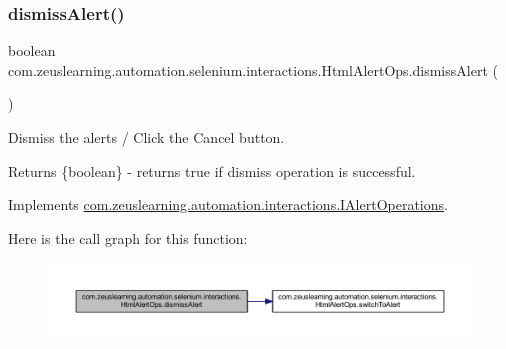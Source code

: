 \subsubsection{\texorpdfstring{dismiss\+Alert()}{dismissAlert()}}
{\footnotesize\ttfamily boolean com.\+zeuslearning.\+automation.\+selenium.\+interactions.\+Html\+Alert\+Ops.\+dismiss\+Alert (\begin{DoxyParamCaption}{ }\end{DoxyParamCaption})\hspace{0.3cm}{\ttfamily [inline]}}

Dismiss the alerts / Click the {\ttfamily Cancel} button.

\begin{DoxyReturn}{Returns}
\{boolean\} -\/ returns {\ttfamily true} if dismiss operation is successful. 
\end{DoxyReturn}


Implements \hyperlink{interfacecom_1_1zeuslearning_1_1automation_1_1interactions_1_1IAlertOperations_a0c8a54b5a80611b77880dd4cc999e88d}{com.\+zeuslearning.\+automation.\+interactions.\+I\+Alert\+Operations}.

Here is the call graph for this function\+:\nopagebreak
\begin{figure}[H]
\begin{center}
\leavevmode
\includegraphics[width=350pt]{d9/d71/classcom_1_1zeuslearning_1_1automation_1_1selenium_1_1interactions_1_1HtmlAlertOps_aac58187434100d2fe2091f388f082c22_cgraph}
\end{center}
\end{figure}
\hypertarget{classcom_1_1zeuslearning_1_1automation_1_1selenium_1_1interactions_1_1HtmlAlertOps_a7d65f164e9145ca8035e196c7dd7da87}{}\label{classcom_1_1zeuslearning_1_1automation_1_1selenium_1_1interactions_1_1HtmlAlertOps_a7d65f164e9145ca8035e196c7dd7da87} 
